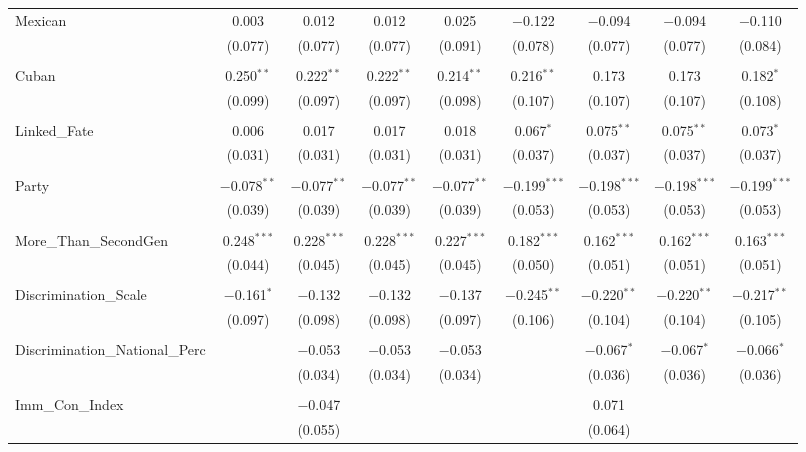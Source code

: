 \begin{table}[!htbp]
\begin{tabular}{@{\extracolsep{5pt}}lcccccccc}
 Mexican & 0.003 & 0.012 & 0.012 & 0.025 & $-$0.122 & $-$0.094 & $-$0.094 & $-$0.110 \\ 
  & (0.077) & (0.077) & (0.077) & (0.091) & (0.078) & (0.077) & (0.077) & (0.084) \\ 
  & & & & & & & & \\ 
 Cuban & 0.250$^{**}$ & 0.222$^{**}$ & 0.222$^{**}$ & 0.214$^{**}$ & 0.216$^{**}$ & 0.173 & 0.173 & 0.182$^{*}$ \\ 
  & (0.099) & (0.097) & (0.097) & (0.098) & (0.107) & (0.107) & (0.107) & (0.108) \\ 
  & & & & & & & & \\ 
 Linked\_Fate & 0.006 & 0.017 & 0.017 & 0.018 & 0.067$^{*}$ & 0.075$^{**}$ & 0.075$^{**}$ & 0.073$^{*}$ \\ 
  & (0.031) & (0.031) & (0.031) & (0.031) & (0.037) & (0.037) & (0.037) & (0.037) \\ 
  & & & & & & & & \\ 
 Party & $-$0.078$^{**}$ & $-$0.077$^{**}$ & $-$0.077$^{**}$ & $-$0.077$^{**}$ & $-$0.199$^{***}$ & $-$0.198$^{***}$ & $-$0.198$^{***}$ & $-$0.199$^{***}$ \\ 
  & (0.039) & (0.039) & (0.039) & (0.039) & (0.053) & (0.053) & (0.053) & (0.053) \\ 
  & & & & & & & & \\ 
 More\_Than\_SecondGen & 0.248$^{***}$ & 0.228$^{***}$ & 0.228$^{***}$ & 0.227$^{***}$ & 0.182$^{***}$ & 0.162$^{***}$ & 0.162$^{***}$ & 0.163$^{***}$ \\ 
  & (0.044) & (0.045) & (0.045) & (0.045) & (0.050) & (0.051) & (0.051) & (0.051) \\ 
  & & & & & & & & \\ 
 Discrimination\_Scale & $-$0.161$^{*}$ & $-$0.132 & $-$0.132 & $-$0.137 & $-$0.245$^{**}$ & $-$0.220$^{**}$ & $-$0.220$^{**}$ & $-$0.217$^{**}$ \\ 
  & (0.097) & (0.098) & (0.098) & (0.097) & (0.106) & (0.104) & (0.104) & (0.105) \\ 
  & & & & & & & & \\ 
 Discrimination\_National\_Perc &  & $-$0.053 & $-$0.053 & $-$0.053 &  & $-$0.067$^{*}$ & $-$0.067$^{*}$ & $-$0.066$^{*}$ \\ 
  &  & (0.034) & (0.034) & (0.034) &  & (0.036) & (0.036) & (0.036) \\ 
  & & & & & & & & \\ 
 Imm\_Con\_Index &  & $-$0.047 &  &  &  & 0.071 &  &  \\ 
  &  & (0.055) &  &  &  & (0.064) &  &  \\ 

\end{tabular}
\end{table}
